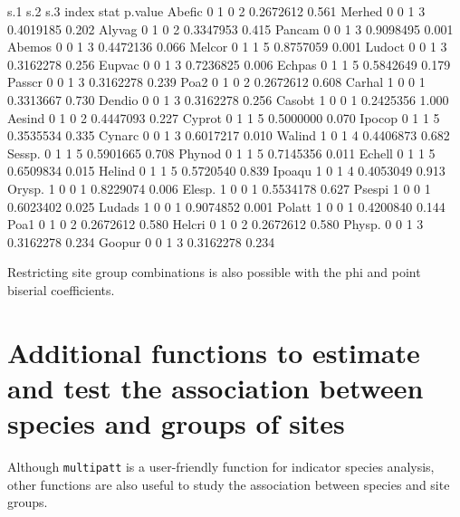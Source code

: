 \documentclass[11pt,a4paper]{article}
\begin{document}
\begin{Schunk}
\begin{Soutput}
       s.1 s.2 s.3 index      stat p.value
Abefic   0   1   0     2 0.2672612   0.561
Merhed   0   0   1     3 0.4019185   0.202
Alyvag   0   1   0     2 0.3347953   0.415
Pancam   0   0   1     3 0.9098495   0.001
Abemos   0   0   1     3 0.4472136   0.066
Melcor   0   1   1     5 0.8757059   0.001
Ludoct   0   0   1     3 0.3162278   0.256
Eupvac   0   0   1     3 0.7236825   0.006
Echpas   0   1   1     5 0.5842649   0.179
Passcr   0   0   1     3 0.3162278   0.239
Poa2     0   1   0     2 0.2672612   0.608
Carhal   1   0   0     1 0.3313667   0.730
Dendio   0   0   1     3 0.3162278   0.256
Casobt   1   0   0     1 0.2425356   1.000
Aesind   0   1   0     2 0.4447093   0.227
Cyprot   0   1   1     5 0.5000000   0.070
Ipocop   0   1   1     5 0.3535534   0.335
Cynarc   0   0   1     3 0.6017217   0.010
Walind   1   0   1     4 0.4406873   0.682
Sessp.   0   1   1     5 0.5901665   0.708
Phynod   0   1   1     5 0.7145356   0.011
Echell   0   1   1     5 0.6509834   0.015
Helind   0   1   1     5 0.5720540   0.839
Ipoaqu   1   0   1     4 0.4053049   0.913
Orysp.   1   0   0     1 0.8229074   0.006
Elesp.   1   0   0     1 0.5534178   0.627
Psespi   1   0   0     1 0.6023402   0.025
Ludads   1   0   0     1 0.9074852   0.001
Polatt   1   0   0     1 0.4200840   0.144
Poa1     0   1   0     2 0.2672612   0.580
Helcri   0   1   0     2 0.2672612   0.580
Physp.   0   0   1     3 0.3162278   0.234
Goopur   0   0   1     3 0.3162278   0.234
\end{Soutput}
\end{Schunk}
Restricting site group combinations is also possible with the phi and point biserial coefficients. 

\section{Additional functions to estimate and test the association between species and groups of sites}
Although \texttt{multipatt} is a user-friendly function for indicator species analysis, other functions are also useful to study the association between species and site groups. 
\end{document}

